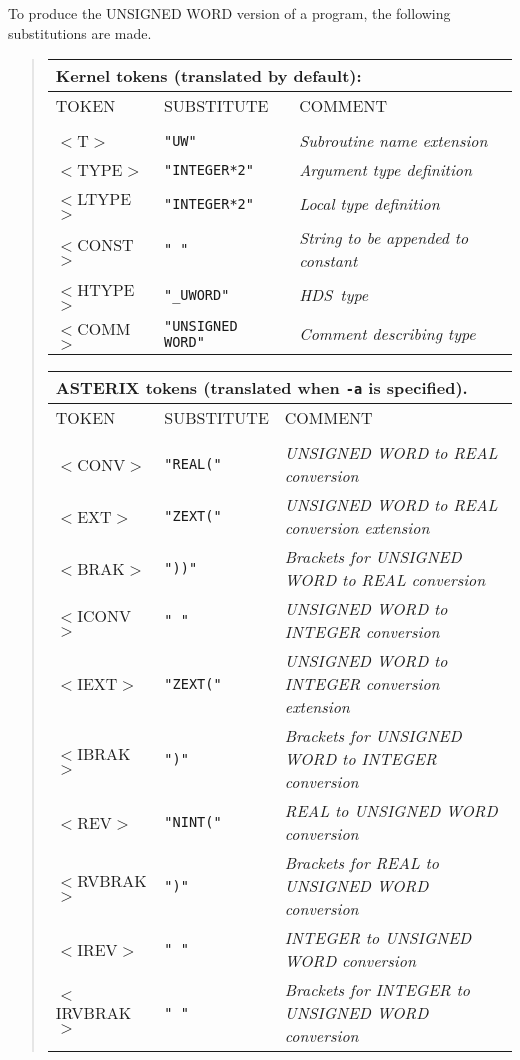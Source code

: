 \documentclass[twoside,11pt,nolof]{starlink}
\providecommand{\HDS}{{\footnotesize HDS}\normalsize}
\begin{document}
To produce the UNSIGNED WORD version of a program, the following
substitutions are made.
\begin{quote}
\begin{tabular}{lll}
\multicolumn{3}{l}{\bf{Kernel} tokens (translated by default):}\\
\hline
TOKEN      &SUBSTITUTE     &COMMENT\\
\\
$<$T$>$     &\texttt{"UW"}            &\emph{Subroutine name extension}\\
$<$TYPE$>$  &\texttt{"INTEGER*2"}     &\emph{Argument type definition}\\
$<$LTYPE$>$ &\texttt{"INTEGER*2"}     &\emph{Local type definition}\\
$<$CONST$>$ &\texttt{" "}         &\emph{String to be appended to constant}\\
$<$HTYPE$>$ &\texttt{"\_UWORD"}       &\emph{\HDS\ type}\\
$<$COMM$>$  &\texttt{"UNSIGNED WORD"} &\emph{Comment describing type}\\
\end{tabular}

\begin{tabular}{lll}
\multicolumn{3}{l}{\bf{ASTERIX} tokens (translated when \texttt{-a} is specified).}\\
\hline
TOKEN      &SUBSTITUTE      &COMMENT\\
\\
$<$CONV$>$     &\texttt{"REAL("} &\emph{UNSIGNED WORD to REAL conversion}\\
$<$EXT$>$      &\texttt{"ZEXT("} &\emph{UNSIGNED WORD to REAL conversion extension}\\
$<$BRAK$>$     &\texttt{"))"}    &\emph{Brackets for UNSIGNED WORD to REAL conversion}\\
$<$ICONV$>$    &\texttt{" "}     &\emph{UNSIGNED WORD to INTEGER conversion}\\
$<$IEXT$>$     &\texttt{"ZEXT("} &\emph{UNSIGNED WORD to INTEGER conversion extension}\\
$<$IBRAK$>$    &\texttt{")"}     &\emph{Brackets for UNSIGNED WORD to INTEGER conversion}\\
$<$REV$>$      &\texttt{"NINT("} &\emph{REAL to UNSIGNED WORD conversion}\\
$<$RVBRAK$>$   &\texttt{")"}     &\emph{Brackets for REAL to UNSIGNED WORD conversion}\\
$<$IREV$>$     &\texttt{" "}     &\emph{INTEGER to UNSIGNED WORD conversion}\\
$<$IRVBRAK$>$  &\texttt{" "}     &\emph{Brackets for INTEGER to UNSIGNED WORD conversion}\\
\end{tabular}
\end{quote}
\end{document}
